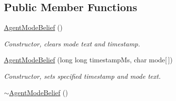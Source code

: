 \subsection*{Public Member Functions}
\begin{DoxyCompactItemize}
\item 
\hypertarget{class_agent_mode_belief_a8fce5be405fbe25693767878e3e13dcf}{
\hyperlink{class_agent_mode_belief_a8fce5be405fbe25693767878e3e13dcf}{AgentModeBelief} ()}
\label{class_agent_mode_belief_a8fce5be405fbe25693767878e3e13dcf}

\begin{DoxyCompactList}\small\item\em Constructor, clears mode text and timestamp. \end{DoxyCompactList}\item 
\hyperlink{class_agent_mode_belief_ac44a4acd6034041616ed98e94ff562ec}{AgentModeBelief} (long long timestampMs, char mode\mbox{[}$\,$\mbox{]})
\begin{DoxyCompactList}\small\item\em Constructor, sets specified timestamp and mode text. \end{DoxyCompactList}\item 
\hypertarget{class_agent_mode_belief_a869c82abe3e7facbce5c9916588b9688}{
\hyperlink{class_agent_mode_belief_a869c82abe3e7facbce5c9916588b9688}{$\sim$AgentModeBelief} ()}
\label{class_agent_mode_belief_a869c82abe3e7facbce5c9916588b9688}


\end{DoxyCompactItemize}

